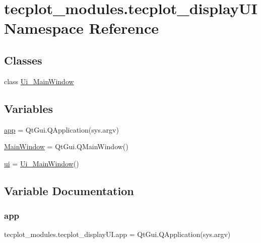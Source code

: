 \hypertarget{namespacetecplot__modules_1_1tecplot__display_u_i}{}\section{tecplot\+\_\+modules.\+tecplot\+\_\+display\+UI Namespace Reference}
\label{namespacetecplot__modules_1_1tecplot__display_u_i}
\subsection*{Classes}
\begin{DoxyCompactItemize}
\item 
class \hyperlink{classtecplot__modules_1_1tecplot__display_u_i_1_1_ui___main_window}{Ui\+\_\+\+Main\+Window}
\end{DoxyCompactItemize}
\subsection*{Variables}
\begin{DoxyCompactItemize}
\item 
\hyperlink{namespacetecplot__modules_1_1tecplot__display_u_i_af6c75ceae00a9a5ef4b5025551b09205}{app} = Qt\+Gui.\+Q\+Application(sys.\+argv)
\item 
\hyperlink{namespacetecplot__modules_1_1tecplot__display_u_i_a05b56eca3c779fabf41fa975030e6ca1}{Main\+Window} = Qt\+Gui.\+Q\+Main\+Window()
\item 
\hyperlink{namespacetecplot__modules_1_1tecplot__display_u_i_aa95df04768ef9b320020d0084673133a}{ui} = \hyperlink{classtecplot__modules_1_1tecplot__display_u_i_1_1_ui___main_window}{Ui\+\_\+\+Main\+Window}()
\end{DoxyCompactItemize}


\subsection{Variable Documentation}
\hypertarget{namespacetecplot__modules_1_1tecplot__display_u_i_af6c75ceae00a9a5ef4b5025551b09205}{}\label{namespacetecplot__modules_1_1tecplot__display_u_i_af6c75ceae00a9a5ef4b5025551b09205} 
\subsubsection{\texorpdfstring{app}{app}}
{\footnotesize\ttfamily tecplot\+\_\+modules.\+tecplot\+\_\+display\+U\+I.\+app = Qt\+Gui.\+Q\+Application(sys.\+argv)}

